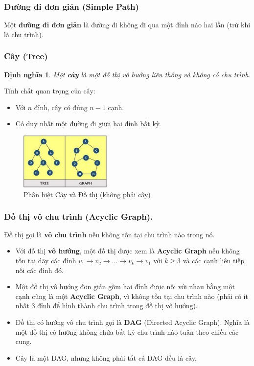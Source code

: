 \documentclass{article}
\newtheorem{dinhnghia}{Định nghĩa}
\begin{document}
\subsubsection{Đường đi đơn giản (Simple Path)}
Một \textbf{đường đi đơn giản} là đường đi không đi qua một đỉnh nào hai lần (trừ khi là chu trình).

\subsubsection{Cây (Tree)}
\begin{dinhnghia}
    
    Một \textbf{cây} là một đồ thị vô hướng liên thông và không có chu trình.
    
\end{dinhnghia}
Tính chất quan trọng của cây:
\begin{itemize}
    \item Với $n$ đỉnh, cây có đúng $n - 1$ cạnh.
    \item Có duy nhất một đường đi giữa hai đỉnh bất kỳ.
\end{itemize}

\begin{figure}[H]
    \centering
    \includegraphics[width=0.4\textwidth]{img/b1/treegraph.png}
    \caption{Phân biệt Cây và Đồ thị (không phải cây)}
    \label{treegraph}
\end{figure}

\subsubsection{Đồ thị vô chu trình (Acyclic Graph).}
Đồ thị gọi là \textbf{vô chu trình} nếu không tồn tại chu trình nào trong nó.
\begin{itemize}
    \item Với đồ thị \textbf{vô hướng}, một đồ thị được xem là \textbf{Acyclic Graph} nếu không tồn tại dãy các đỉnh $v_1 \rightarrow v_2 \rightarrow \dots \rightarrow v_k \rightarrow v_1$ với $k \geq 3$ và các cạnh liên tiếp nối các đỉnh đó.
    \item Một đồ thị vô hướng đơn giản gồm hai đỉnh được nối với nhau bằng một cạnh cũng là một \textbf{Acyclic Graph}, vì không tồn tại chu trình nào (phải có ít nhất 3 đỉnh để hình thành chu trình trong đồ thị vô hướng).
    \item Đồ thị có hướng vô chu trình gọi là \textbf{DAG} (Directed Acyclic Graph). Nghĩa là một đồ thị có hướng không chứa bất kỳ chu trình nào tuân theo chiều các cung.
    \item Cây là một DAG, nhưng không phải tất cả DAG đều là cây.
\end{itemize}
\end{document}
